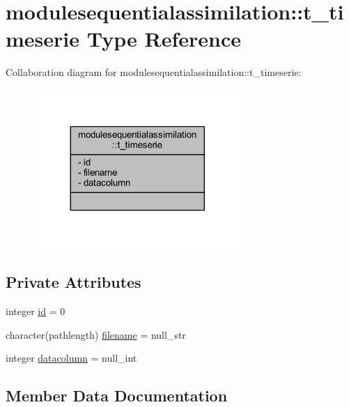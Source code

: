 \hypertarget{structmodulesequentialassimilation_1_1t__timeserie}{}\section{modulesequentialassimilation\+:\+:t\+\_\+timeserie Type Reference}
\label{structmodulesequentialassimilation_1_1t__timeserie}


Collaboration diagram for modulesequentialassimilation\+:\+:t\+\_\+timeserie\+:\nopagebreak
\begin{figure}[H]
\begin{center}
\leavevmode
\includegraphics[width=224pt]{structmodulesequentialassimilation_1_1t__timeserie__coll__graph}
\end{center}
\end{figure}
\subsection*{Private Attributes}
\begin{DoxyCompactItemize}
\item 
integer \mbox{\hyperlink{structmodulesequentialassimilation_1_1t__timeserie_a7fc9b94386349e82d50d9298d932df45}{id}} = 0
\item 
character(pathlength) \mbox{\hyperlink{structmodulesequentialassimilation_1_1t__timeserie_adfe5164a6b06bbef23f3ab32ce09be84}{filename}} = null\+\_\+str
\item 
integer \mbox{\hyperlink{structmodulesequentialassimilation_1_1t__timeserie_ac5510fa59958855468d30511c0a44bcc}{datacolumn}} = null\+\_\+int
\end{DoxyCompactItemize}


\subsection{Member Data Documentation}
\mbox{\label{structmodulesequentialassimilation_1_1t__timeserie_ac5510fa59958855468d30511c0a44bcc}} 
